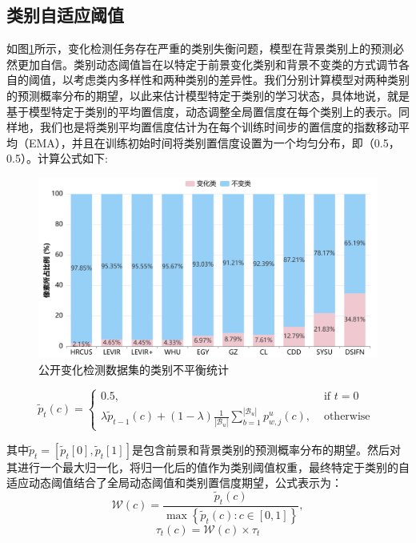 \documentclass[lang=chs, degree=master, blindreview=false, adobe=false]{yanputhesis}
\begin{document}
\subsection{类别自适应阈值}
如图\ref{fig:Adasemicd_imbalance}所示，变化检测任务存在严重的类别失衡问题，模型在背景类别上的预测必然更加自信。类别动态阈值旨在以特定于前景变化类别和背景不变类的方式调节各自的阈值，以考虑类内多样性和两种类别的差异性。我们分别计算模型对两种类别的预测概率分布的期望，以此来估计模型特定于类别的学习状态，具体地说，就是基于模型特定于类别的平均置信度，动态调整全局置信度在每个类别上的表示。同样地，我们也是将类别平均置信度估计为在每个训练时间步的置信度的指数移动平均（EMA），并且在训练初始时间将类别置信度设置为一个均匀分布，即（0.5，0.5）。计算公式如下:
\begin{figure}[htb]
  \centering
  \includegraphics[scale=0.25]{images/imbalance.png}
  \caption{
    公开变化检测数据集的类别不平衡统计
  }
  \label{fig:Adasemicd_imbalance}
\end{figure}
\begin{equation}
    \label{eq:Adath_pmodel}
    \tilde{p}_{t}(c)=\left\{\begin{array}{ll}
      0.5, & \text { if } t=0 \\
      \lambda \tilde{p}_{t-1}(c)+(1-\lambda) \frac{1}{\left|\mathcal{B}_{u}\right|} \sum_{b=1}^{\left|\mathcal{B}_{u}\right|} p_{w, j}^{u}(c), & \text { otherwise }
      \end{array}\right.
\end{equation}

其中$\tilde{p}_{t} = [\tilde{p}_{t}[0], \tilde{p}_{t}[1]]$是包含前景和背景类别的预测概率分布的期望。然后对其进行一个最大归一化，将归一化后的值作为类别阈值权重，最终特定于类别的自适应动态阈值结合了全局动态阈值和类别置信度期望，公式表示为：
\begin{equation}
  \label{eq:Adath_weight}
  \mathcal{W}(c)=\frac{\tilde{p}_{t}(c)}{\max \left\{\tilde{p}_{t}(c): c \in[0, 1]\right\}},
\end{equation}
\begin{equation}
  \label{eq:Adath_localTh}
  \tau_{t}(c)=\mathcal{W}(c) \times \tau_{t}
\end{equation}
\end{document}
